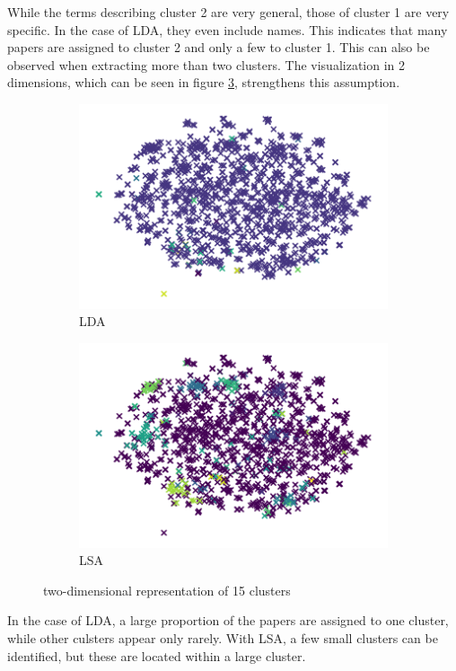 While the terms describing cluster 2 are very general, those of cluster 1 are very specific.
In the case of LDA, they even include names.
This indicates that many papers are assigned to cluster 2 and only a few to cluster 1.
This can also be observed when extracting more than two clusters.
The visualization in 2 dimensions, which can be seen in figure \ref{fig:lda_lsa}, strengthens this assumption.
\begin{figure}
\centering
\begin{subfigure}{.4\textwidth}
  \centering
  \includegraphics[width=\linewidth]{imgs/lda.png}
  \caption{LDA}
  \label{fig:lda}
\end{subfigure}%
\begin{subfigure}{.4\textwidth}
  \centering
  \includegraphics[width=\linewidth]{imgs/lsa.png}
  \caption{LSA}
  \label{fig:lsa}
\end{subfigure}
\caption{two-dimensional representation of 15 clusters}
\label{fig:lda_lsa}
\end{figure}
In the case of LDA, a large proportion of the papers are assigned to one cluster, while other culsters appear only rarely.
With LSA, a few small clusters can be identified, but these are located within a large cluster.

